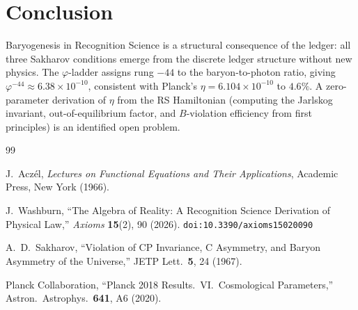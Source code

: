 \documentclass[12pt,a4paper]{article}
\theoremstyle{definition}
\theoremstyle{remark}
\begin{document}
\section{Conclusion}
\label{sec:conclusion}

Baryogenesis in Recognition Science is a structural consequence of
the ledger: all three Sakharov conditions emerge from the discrete
ledger structure without new physics.  The $\varphi$-ladder assigns
rung $-44$ to the baryon-to-photon ratio, giving
$\varphi^{-44} \approx 6.38 \times 10^{-10}$, consistent with
Planck's $\eta = 6.104 \times 10^{-10}$ to $4.6\%$.  A zero-parameter
derivation of $\eta$ from the RS Hamiltonian (computing the Jarlskog
invariant, out-of-equilibrium factor, and $B$-violation efficiency
from first principles) is an identified open problem.

\begin{thebibliography}{99}

J.~Acz\'el, \textit{Lectures on Functional Equations and Their
Applications}, Academic Press, New York (1966).

J.~Washburn, ``The Algebra of Reality: A Recognition Science Derivation
of Physical Law,'' \emph{Axioms} \textbf{15}(2), 90 (2026).
\texttt{doi:10.3390/axioms15020090}

A.~D.~Sakharov, ``Violation of CP Invariance, C Asymmetry, and
Baryon Asymmetry of the Universe,'' JETP Lett.\ \textbf{5}, 24
(1967).

Planck Collaboration, ``Planck 2018 Results.\ VI.\ Cosmological
Parameters,'' Astron.\ Astrophys.\ \textbf{641}, A6 (2020).

\end{thebibliography}
\end{document}
